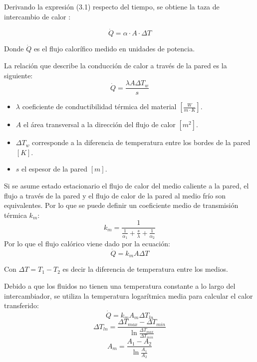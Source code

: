 \documentclass[letterpaper,11pt]{article} %
\begin{document}
 Derivando la expresión (3.1) respecto del tiempo, se obtiene la taza de intercambio de calor :
 
 \begin{equation}
     \dot Q = \alpha \cdot A \cdot \Delta T
 \end{equation}

 Donde $\dot Q$ es el flujo calorífico medido en unidades de potencia.
 
La relación que describe la conducción de calor a través de la pared es la siguiente:
\begin{equation}
    \Dot{Q} = \frac{\lambda A \Delta T_w}{s}
\end{equation}
\begin{itemize}
    \item $\lambda$ coeficiente de conductibilidad térmica del material $[\frac{W}{m\cdot K}]$.
    \item $A$ el área transversal a la dirección del flujo de calor $[m^2]$.
    \item $\Delta T_w$ corresponde a la diferencia de temperatura entre los bordes de la pared $[K]$.
    \item $s$ el espesor de la pared $[m]$.
\end{itemize}

Si se asume estado estacionario el flujo de calor del medio caliente a la pared, el flujo a través de la pared y el flujo de calor de la pared al medio frío son equivalentes.  Por lo que se puede definir un coeficiente medio de transmisión térmica $k_m$:
\begin{equation}
    k_m = \frac{1}{\frac{1}{\alpha_1}+\frac{s}{\lambda}+\frac{1}{\alpha_2}}
\end{equation}
Por lo que el flujo calórico viene dado por la ecuación:
\begin{equation}
    \Dot{Q} = k_m A \Delta T
\end{equation}

Con $\Delta T = T_1 - T_2$ es decir la diferencia de temperatura entre los medios.

Debido a que los fluidos no tienen una temperatura constante a lo largo del intercambiador, se utiliza la temperatura logarítmica media para calcular el calor transferido:
\begin{equation}
    \Dot{Q} = k_m A_m \Delta T_{ln}
\end{equation}
\begin{equation}
    \Delta T_{ln} = \frac{\Delta T_{max}-\Delta T_{min}}{\ln{ \frac{\Delta T_{max}}{\Delta T_{min}}}}
\end{equation}
\begin{equation}
    A_m = \frac{A_1-A_2}{\ln{\frac{A_1}{A_2}}}
\end{equation}
\newpage
\end{document}
